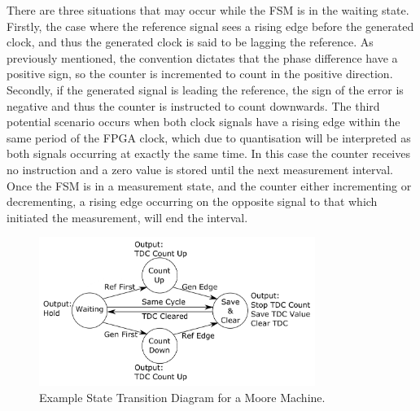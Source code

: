 There are three situations that may occur while the \ac{FSM} is in the waiting state. Firstly, the case where the reference signal sees a rising edge before the generated clock, and thus the generated clock is said to be lagging the reference. As previously mentioned, the convention dictates that the phase difference have a positive sign, so the counter is incremented to count in the positive direction. Secondly, if the generated signal is leading the reference, the sign of the error is negative and thus the counter is instructed to count downwards. The third potential scenario occurs when both clock signals have a rising edge within the same period of the \ac{FPGA} clock, which due to quantisation will be interpreted as both signals occurring at exactly the same time. In this case the counter receives no instruction and a zero value is stored until the next measurement interval. Once the \ac{FSM} is in a measurement state, and the counter either incrementing or decrementing, a rising edge occurring on the opposite signal to that which initiated the measurement, will end the interval.
\begin{figure}[h]
	\centering
	\includegraphics[width=0.8\textwidth]{../state_trans_new}
	\caption[Example State Transition Diagram for a Moore Machine]{Example State Transition Diagram for a Moore Machine.}
	\label{fig:state_trans}
\end{figure}

